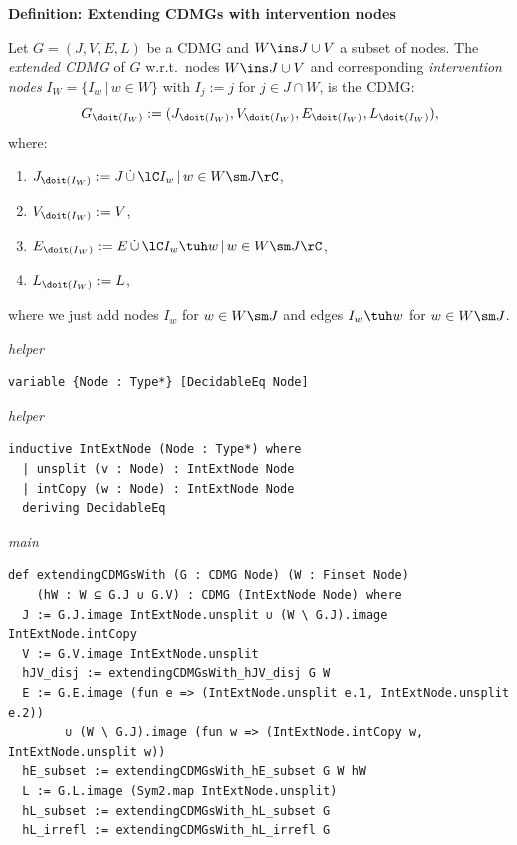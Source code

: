 \noindent\textbf{Definition: Extending CDMGs with intervention nodes}\par\smallskip
{\appendixTexSize
\label{def:cdmg_intervention_nodes}
  Let $G=(J,V,E,L)$ be a CDMG and $W \ins J \cup V$ a subset of nodes.
  The \emph{extended CDMG} of $G$ w.r.t.\ nodes $W \ins J \cup V$  and corresponding \emph{intervention nodes} 
  $I_W = \{I_w \,|\, w \in W\}$ with $I_j:=j$ for $j \in J \cap W$,
  is the CDMG: 
  \[ G_{\doit(I_W)}:=(J_{\doit(I_W)},V_{\doit(I_W)},E_{\doit(I_W)},L_{\doit(I_W)}),\]
  where:
  \begin{enumerate}[label=\roman*.)]
      \item $J_{\doit(I_W)}:= J\, \dot{\cup} \, \lC I_w\,|\, w \in W \sm J \rC$, %
      \item $V_{\doit(I_W)}:= V$,
      \item $E_{\doit(I_W)}:= E\, \dot{\cup} \, \lC I_w \tuh w \,|\, w \in W\sm J \rC$,
      \item $L_{\doit(I_W)}:= L$,
  \end{enumerate}
  where we just add nodes $I_w$ for $w \in W \sm J$ and edges $I_w \tuh w$ for $ w \in W \sm J$.
\par}
\smallskip
{\small\textit{helper}}
\begin{verbatim}
variable {Node : Type*} [DecidableEq Node]
\end{verbatim}
{\small\textit{helper}}
\begin{verbatim}
inductive IntExtNode (Node : Type*) where
  | unsplit (v : Node) : IntExtNode Node
  | intCopy (w : Node) : IntExtNode Node
  deriving DecidableEq
\end{verbatim}
{\small\textit{main}}
\begin{verbatim}
def extendingCDMGsWith (G : CDMG Node) (W : Finset Node)
    (hW : W ⊆ G.J ∪ G.V) : CDMG (IntExtNode Node) where
  J := G.J.image IntExtNode.unsplit ∪ (W \ G.J).image IntExtNode.intCopy
  V := G.V.image IntExtNode.unsplit
  hJV_disj := extendingCDMGsWith_hJV_disj G W
  E := G.E.image (fun e => (IntExtNode.unsplit e.1, IntExtNode.unsplit e.2))
        ∪ (W \ G.J).image (fun w => (IntExtNode.intCopy w, IntExtNode.unsplit w))
  hE_subset := extendingCDMGsWith_hE_subset G W hW
  L := G.L.image (Sym2.map IntExtNode.unsplit)
  hL_subset := extendingCDMGsWith_hL_subset G
  hL_irrefl := extendingCDMGsWith_hL_irrefl G
\end{verbatim}
~%

